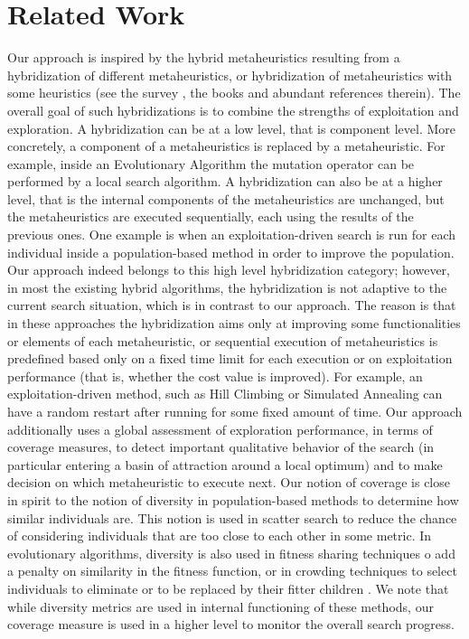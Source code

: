 \section{Related Work}
Our approach is inspired by the hybrid metaheuristics resulting from a hybridization of different metaheuristics, or hybridization of metaheuristics with some heuristics (see the survey \cite{Talbi2009}, the books \cite{Lones2011,Talbi2013,Talbi2014} and abundant references therein). The overall goal of such hybridizations is to combine the strengths of exploitation and exploration. A hybridization can be at a low level, that is component level. More concretely, a component of a metaheuristics is replaced by a metaheuristic. For example, inside an Evolutionary Algorithm the mutation operator can be performed by a local search algorithm. A hybridization can also be at a higher level, that is the internal components of the metaheuristics are unchanged, but the metaheuristics are executed sequentially, each using the results of the previous ones. One example is when an exploitation-driven search is run for each individual inside a population-based method in order to improve the population. Our approach indeed belongs to this high level hybridization category; however, in most the existing hybrid algorithms, the hybridization is not adaptive to the current search situation, which is in contrast to our approach. The reason is that in these approaches the hybridization aims only at improving some functionalities or elements of each metaheuristic, or sequential execution of metaheuristics is predefined based only on a fixed time limit for each execution or on exploitation performance (that is, whether the cost value is improved). For example, an exploitation-driven method, such as Hill Climbing or Simulated Annealing can have a random restart after running for some fixed amount of time. Our approach additionally uses a global assessment of exploration performance, in terms of coverage measures, to detect important qualitative behavior of the search (in particular entering a basin of attraction around a local optimum) and to make decision on which metaheuristic to execute next. Our notion of coverage is close in spirit to the notion of diversity in population-based methods to determine how similar individuals are. This notion is used in scatter search \cite{Glover2011} to reduce the chance of considering individuals that are too close to each other in some metric. In evolutionary algorithms, diversity is also used in fitness sharing techniques o add a penalty on similarity in the fitness function, or in crowding techniques to select individuals to eliminate or to be replaced by their fitter children \cite{WongWMPZ2012}. We note that while diversity metrics are used in internal functioning of these methods, our coverage measure is used in a higher level to monitor the overall search progress.
